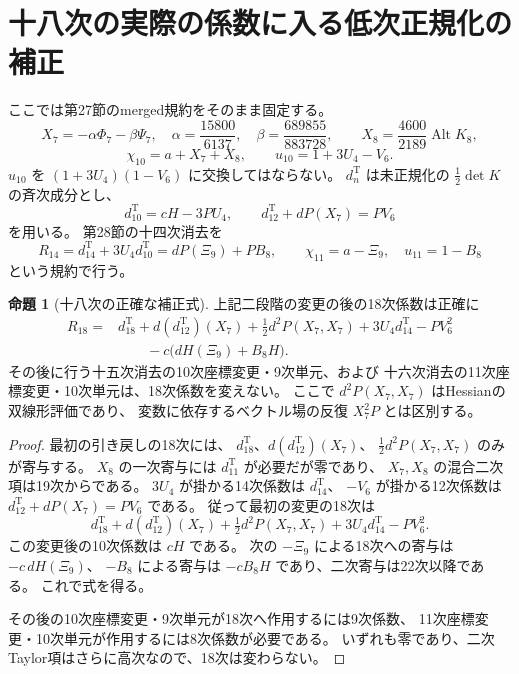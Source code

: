 \documentclass[a4paper,11pt]{ltjsarticle}
\theoremstyle{definition}
\newtheorem{proposition}[theorem]{命題}
\begin{document}
\section{十八次の実際の係数に入る低次正規化の補正}
\label{sec:v14-eighteenth-corrections}

ここでは第27節のmerged規約をそのまま固定する。
\[
 X_7=-\alpha\Phi_7-\beta\Psi_7,
 \quad\alpha=\frac{15800}{6137},\quad
 \beta=\frac{689855}{883728},\qquad
 X_8=\frac{4600}{2189}\operatorname{Alt}K_8,
\]
\[
 \chi_{10}=a+X_7+X_8,\qquad u_{10}=1+3U_4-V_6.
\]
$u_{10}$ を $(1+3U_4)(1-V_6)$ に交換してはならない。
$d^{\mathrm T}_n$ は未正規化の $\tfrac12\det K$ の斉次成分とし、
\[
 d^{\mathrm T}_{10}=cH-3PU_4,
 \qquad d^{\mathrm T}_{12}+dP(X_7)=PV_6
\]
を用いる。
第28節の十四次消去を
\[
 R_{14}=d^{\mathrm T}_{14}+3U_4d^{\mathrm T}_{10}
       =dP(\Xi_9)+PB_8,
 \qquad\chi_{11}=a-\Xi_9,\quad u_{11}=1-B_8
\]
という規約で行う。

\begin{proposition}[十八次の正確な補正式]
\label{prop:v14-raw-eighteen-correction}
上記二段階の変更の後の18次係数は正確に
\begin{equation}\label{eq:v14-raw-eighteen-correction}
 \begin{split}
 R_{18}={}&d^{\mathrm T}_{18}
   +d(d^{\mathrm T}_{12})(X_7)
   +\frac12d^2P(X_7,X_7)
   +3U_4d^{\mathrm T}_{14}-PV_6^2\\
   &\hspace{2em}-c\bigl(dH(\Xi_9)+B_8H\bigr).
 \end{split}
\end{equation}
その後に行う十五次消去の10次座標変更・9次単元、および
十六次消去の11次座標変更・10次単元は、18次係数を変えない。
ここで $d^2P(X_7,X_7)$ はHessianの双線形評価であり、
変数に依存するベクトル場の反復 $X_7^2P$ とは区別する。
\end{proposition}

\begin{proof}
最初の引き戻しの18次には、
$d^{\mathrm T}_{18}$、$d(d^{\mathrm T}_{12})(X_7)$、
$\tfrac12d^2P(X_7,X_7)$ のみが寄与する。
$X_8$ の一次寄与には $d^{\mathrm T}_{11}$ が必要だが零であり、
$X_7,X_8$ の混合二次項は19次からである。
$3U_4$ が掛かる14次係数は $d^{\mathrm T}_{14}$、
$-V_6$ が掛かる12次係数は
$d^{\mathrm T}_{12}+dP(X_7)=PV_6$ である。
従って最初の変更の18次は
\[
 d^{\mathrm T}_{18}+d(d^{\mathrm T}_{12})(X_7)
 +\tfrac12d^2P(X_7,X_7)+3U_4d^{\mathrm T}_{14}-PV_6^2.
\]
この変更後の10次係数は $cH$ である。
次の $-\Xi_9$ による18次への寄与は $-c\,dH(\Xi_9)$、
$-B_8$ による寄与は $-cB_8H$ であり、二次寄与は22次以降である。
これで式を得る。

その後の10次座標変更・9次単元が18次へ作用するには9次係数、
11次座標変更・10次単元が作用するには8次係数が必要である。
いずれも零であり、二次Taylor項はさらに高次なので、18次は変わらない。
\end{proof}
\end{document}
